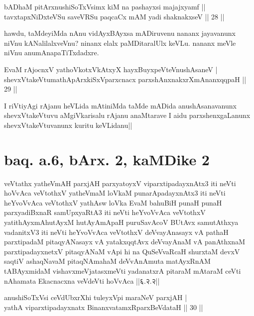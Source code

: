 \begin{shl}
bADhaM pitArx\s nushiSoTxV\s simx kiM na pashayxsi majajxyamf || \\
tavxtapxNiDxteVSu saveVRSu paqcaCx mAM yadi shaknakxseV \hfill|| 28 || 
\end{shl}

\begin{artha}
hawdu, taMdeyiMda nAnu vidAyxBAyxsa mADiruvenu nananx jayavanunx niVnu 
kANalilalxveVnu? ninanx elalx paMDitaralUlx keVLu. nananx meVle niVnu 
anumAnapaTiTxdadxre.
\end{artha}

\begin{shl}
EvaM rAjocnxV yathoVkotxVkAtxyX hayxBuyxpeVteV\s nushAsaneV | \\
shevxVtakeVtumathApArxkiSxVparxcnacx parxshAnxnakxrXmAnanxqqpaH \hfill|| 29 || 
\end{shl}

\begin{artha}
I riVtiyAgi rAjanu heVLida mAtiniMda taMde mADida anushAsanavanunx 
shevxVtakeVtuvu aMgiVkarisalu rAjanu anaMtarave I aidu 
parxshenxgaLanunx shevxVtakeVtuvanunx kuritu keVLidanu||
\end{artha}

\section*{baq. a.6, bArx. 2, kaMDike 2}

\begin{shl}
veVtathx yatheVmAH parxjAH parxyatoyxV viparxtipadayxnAtx3 iti neVti hoVvAca veVtothxV yatheVmaM loVkaM punarApadayxnAtx3 iti neVti heYvoVvAca veVtothxV yathAsw loVka EvaM bahuBiH punaH punaH parxyadiBxnaR samUpxyaRtA3 iti neVti heYvoVvAca veVtothxV yatithAyxmAhutAyxM hutAyAmApaH puruSavAcoV BUtAvx samutAthxya vadanitxV3 iti neVti heYvoVvAca veVtothxV deVvayAnasayx vA pathaH parxtipadaM pitaqyANasayx vA yatakxqqtAvx deVvayAnaM vA panAthxnaM parxtipadayxnetxV pitaqyANaM vApi hi na QuSeVvaRcaH shurxtaM devxV saqtiV ashaqNavaM pitaqNAmahaM deVvAnAmuta matAyxRnAM tABAyxmidaM vishavxmeVjatasxmeVti yadanatxrA pitaraM mAtaraM ceVti nAhamata Ekacnacxna veVdeVti hoVvAca ||६.२.२||
\end{shl}


\begin{shl}
anushiSoTxV\s si ceVdUbxrXhi tuleyxV\s pi maraNeV parxjAH | \\
yathA viparxtipadayxnatx BinanxvatamxRparxBeVdataH \hfill|| 30 || 
\end{shl}

